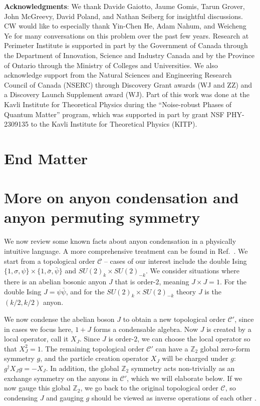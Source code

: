 \documentclass[aps, prl, superscriptaddress, twocolumn,
notitlepage, longbibliography,
floatfix]{revtex4-2}
\newcommand{\1}{\text{\uppercase\expandafter{\romannumeral1}}}
\newcommand{\2}{\text{\uppercase\expandafter{\romannumeral2}}}
\newcommand{\3}{\text{\uppercase\expandafter{\romannumeral3}}}
\newcommand{\4}{\text{\uppercase\expandafter{\romannumeral4}}}
\newcommand{\5}{\text{\uppercase\expandafter{\romannumeral5}}}
\newcommand{\6}{\text{\uppercase\expandafter{\romannumeral6}}}
\def\Z{\mathbb{Z}}
\begin{document}
\textbf{Acknowledgments}: We thank Davide Gaiotto, Jaume Gomis, Tarun Grover, John McGreevy, David Poland, and Nathan Seiberg for insightful discussions. CW would like to especially thank Yin-Chen He, Adam Nahum, and Weicheng Ye for many conversations on this problem over the past few years. Research at Perimeter Institute is supported in part by the Government of Canada through the Department of Innovation, Science and Industry Canada and by the Province of Ontario through the Ministry of Colleges and Universities. We also acknowledge support from the Natural Sciences and Engineering Research Council of Canada (NSERC) through Discovery Grant awards (WJ and ZZ) and a Discovery Launch Supplement award (WJ). Part of this work was done at the Kavli Institute for Theoretical Physics during the ``Noise-robust Phases of Quantum Matter'' program, which was supported in part by grant NSF PHY-2309135 to the Kavli Institute for Theoretical Physics (KITP).




\section*{End Matter}


\section{More on anyon condensation and anyon permuting symmetry}



We now review some known facts about anyon condensation in a physically intuitive language. A more comprehensive treatment can be found in Ref.~\cite{bais2009condensate, Barkeshli:2014cna,burnell2018anyon}. We start from a topological order $\mathcal{C}$ -- cases of our interest include the double Ising $\{1,\sigma,\psi\}\times\{1,\bar{\sigma},\bar{\psi}\}$ and $SU(2)_k\times SU(2)_{-k}$. We consider situations where there is an abelian bosonic anyon $J$ that is order-$2$, meaning $J\times J= 1$. For the double Ising $J=\psi\bar{\psi}$, and for the $SU(2)_k\times SU(2)_{-k}$ theory $J$ is the $(k/2,k/2)$ anyon.

We now condense the abelian boson $J$ to obtain a new topological order $\mathcal{C}'$, since in cases we focus here, $1+J$ forms a condensable algebra. Now $J$ is created by a local operator, call it $X_J$. Since $J$ is order-$2$, we can choose the local operator so that $X_J^2=1$. The remaining topological order $\mathcal{C}'$ can have a $\Z_2$ global zero-form symmetry $g$, and the particle creation operator $X_J$ will be charged under $g$: $g^{\dagger}X_Jg=-X_J$. In addition, the global $\mathbb{Z}_2$ symmetry acts non-trivially as an exchange symmetry on the anyons in $\mathcal{C}'$, which we will elaborate below. If we now gauge this global $\Z_2$, we go back to the original topological order $\mathcal{C}$, so condensing $J$ and gauging $g$ should be viewed as inverse operations of each other \cite{2009arXiv0906.0620D,bais2009condensate,Barkeshli:2014cna}.
\end{document}
